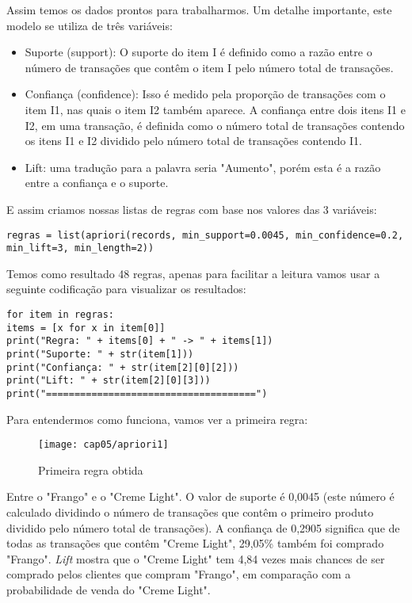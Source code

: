 Assim temos os dados prontos para trabalharmos. Um detalhe importante, este modelo se utiliza de três variáveis:
\begin{itemize}[nolistsep]
	\item Suporte (support): O suporte do item I é definido como a razão entre o número de transações que contêm o item I pelo número total de transações.
	\item Confiança (confidence): Isso é medido pela proporção de transações com o item I1, nas quais o item I2 também aparece. A confiança entre dois itens I1 e I2, em uma transação, é definida como o número total de transações contendo os itens I1 e I2 dividido pelo número total de transações contendo I1.
	\item Lift: uma tradução para a palavra seria "Aumento", porém esta é a razão entre a confiança e o suporte.
\end{itemize}

E assim criamos nossas listas de regras com base nos valores das 3 variáveis:

\begin{lstlisting}[]
regras = list(apriori(records, min_support=0.0045, min_confidence=0.2, min_lift=3, min_length=2))
\end{lstlisting}

Temos como resultado 48 regras, apenas para facilitar a leitura vamos usar a seguinte codificação para visualizar os resultados:
\begin{lstlisting}[]
for item in regras:
items = [x for x in item[0]]
print("Regra: " + items[0] + " -> " + items[1])
print("Suporte: " + str(item[1]))
print("Confiança: " + str(item[2][0][2]))
print("Lift: " + str(item[2][0][3]))
print("=====================================")
\end{lstlisting}

Para entendermos como funciona, vamos ver a primeira regra:
\begin{figure}[H]
	\centering
	\texttt{[image: cap05/apriori1]}
	\caption{Primeira regra obtida}
\end{figure}

Entre o "Frango" e o "Creme Light". O valor de suporte é 0,0045 (este número é calculado dividindo o número de transações que contêm o primeiro produto dividido pelo número total de transações). A confiança de 0,2905 significa que de todas as transações que contêm "Creme Light", 29,05\% também foi comprado "Frango". \textit{Lift} mostra que o "Creme Light" tem 4,84 vezes mais chances de ser comprado pelos clientes que compram "Frango", em comparação com a probabilidade de venda do "Creme Light".

